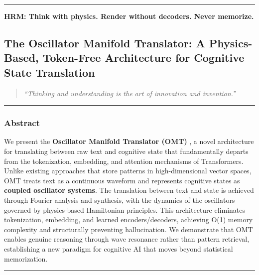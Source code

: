 \documentclass[
  11pt,
  a4paper,
]{article}
\begin{document}
\begin{center}\rule{0.5\linewidth}{0.5pt}\end{center}

\textbf{HRM: Think with physics. Render without decoders. Never
memorize.}

\newpage

\subsection{The Oscillator Manifold Translator: A Physics-Based,
Token-Free Architecture for Cognitive State
Translation}\label{the-oscillator-manifold-translator-a-physics-based-token-free-architecture-for-cognitive-state-translation}

\begin{quote}
\emph{``Thinking and understanding is the art of innovation and
invention.''}
\end{quote}

\begin{center}\rule{0.5\linewidth}{0.5pt}\end{center}

\subsubsection{Abstract}\label{abstract-6}

We present the \textbf{Oscillator Manifold Translator (OMT)} , a novel
architecture for translating between raw text and cognitive state that
fundamentally departs from the tokenization, embedding, and attention
mechanisms of Transformers. Unlike existing approaches that store
patterns in high-dimensional vector spaces, OMT treats text as a
continuous waveform and represents cognitive states as \textbf{coupled
oscillator systems}. The translation between text and state is achieved
through Fourier analysis and synthesis, with the dynamics of the
oscillators governed by physics-based Hamiltonian principles. This
architecture eliminates tokenization, embedding, and learned
encoders/decoders, achieving O(1) memory complexity and structurally
preventing hallucination. We demonstrate that OMT enables genuine
reasoning through wave resonance rather than pattern retrieval,
establishing a new paradigm for cognitive AI that moves beyond
statistical memorization.

\begin{center}\rule{0.5\linewidth}{0.5pt}\end{center}
\end{document}
